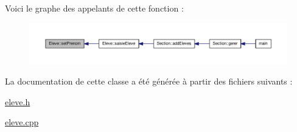 Voici le graphe des appelants de cette fonction \-:
\nopagebreak
\begin{figure}[H]
\begin{center}
\leavevmode
\includegraphics[width=350pt]{class_eleve_a204474920420c637c2db34676fa5b6f1_icgraph}
\end{center}
\end{figure}




La documentation de cette classe a été générée à partir des fichiers suivants \-:\begin{DoxyCompactItemize}
\item 
\hyperlink{eleve_8h}{eleve.\-h}\item 
\hyperlink{eleve_8cpp}{eleve.\-cpp}\end{DoxyCompactItemize}
